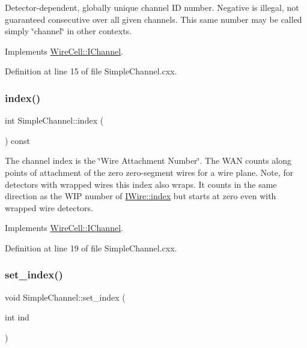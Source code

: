 Detector-\/dependent, globally unique channel ID number. Negative is illegal, not guaranteed consecutive over all given channels. This same number may be called simply \char`\"{}channel\char`\"{} in other contexts. 

Implements \hyperlink{class_wire_cell_1_1_i_channel_a402dc3c45e1827f7437b7db059a834b1}{Wire\+Cell\+::\+I\+Channel}.



Definition at line 15 of file Simple\+Channel.\+cxx.

\mbox{\label{class_wire_cell_1_1_simple_channel_af16019937e1b8fb48860f405c4607757}} 
\subsubsection{\texorpdfstring{index()}{index()}}
{\footnotesize\ttfamily int Simple\+Channel\+::index (\begin{DoxyParamCaption}{ }\end{DoxyParamCaption}) const\hspace{0.3cm}{\ttfamily [virtual]}}

The channel index is the \char`\"{}\+Wire Attachment Number\char`\"{}. The W\+AN counts along points of attachment of the zero\textquotesingle{} zero-\/segment wires for a wire plane. Note, for detectors with wrapped wires this index also wraps. It counts in the same direction as the W\+IP number of \hyperlink{class_wire_cell_1_1_i_wire_abe81fe1d38c3d0a73e812e765f2081cd}{I\+Wire\+::index} but starts at zero even with wrapped wire detectors. 

Implements \hyperlink{class_wire_cell_1_1_i_channel_a778ee7c6f6b69febe03862b4e2ae2a43}{Wire\+Cell\+::\+I\+Channel}.



Definition at line 19 of file Simple\+Channel.\+cxx.

\mbox{\label{class_wire_cell_1_1_simple_channel_af41051f35a8568c3da51dd28821c3330}} 
\subsubsection{\texorpdfstring{set\+\_\+index()}{set\_index()}}
{\footnotesize\ttfamily void Simple\+Channel\+::set\+\_\+index (\begin{DoxyParamCaption}\item[{int}]{ind }\end{DoxyParamCaption})}



